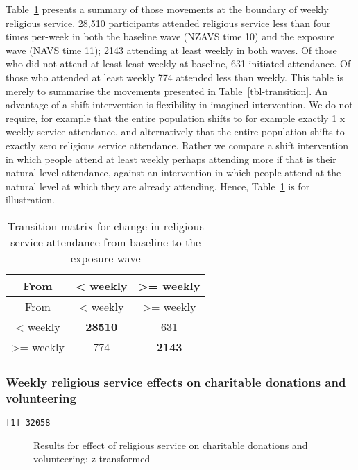 \documentclass[
  singlecolumn]{article}
\begin{document}
Table~\ref{tbl-transition-2} presents a summary of those movements at
the boundary of weekly religious service. 28,510 participants attended
religious service less than four times per-week in both the baseline
wave (NZAVS time 10) and the exposure wave (NAVS time 11); 2143
attending at least weekly in both waves. Of those who did not attend at
least least weekly at baseline, 631 initiated attendance. Of those who
attended at least weekly 774 attended less than weekly. This table is
merely to summarise the movements presented in
Table~\ref{tbl-transition}. An advantage of a shift intervention is
flexibility in imagined intervention. We do not require, for example
that the entire population shifts to for example exactly 1 x weekly
service attendance, and alternatively that the entire population shifts
to exactly zero religious service attendance. Rather we compare a shift
intervention in which people attend at least weekly perhaps attending
more if that is their natural level attendance, against an intervention
in which people attend at the natural level at which they are already
attending. Hence, Table~\ref{tbl-transition-2} is for illustration.

\begin{longtable}[]{@{}ccc@{}}
\caption{Transition matrix for change in religious service attendance
from baseline to the exposure
wave}\label{tbl-transition-2}\tabularnewline
\toprule\noalign{}
From & \textless{} weekly & \textgreater= weekly \\
\midrule\noalign{}
\endfirsthead
\toprule\noalign{}
From & \textless{} weekly & \textgreater= weekly \\
\midrule\noalign{}
\endhead
\bottomrule\noalign{}
\endlastfoot
\textless{} weekly & \textbf{28510} & 631 \\
\textgreater= weekly & 774 & \textbf{2143} \\
\end{longtable}

\subsubsection{Weekly religious service effects on charitable donations
and
volunteering}\label{weekly-religious-service-effects-on-charitable-donations-and-volunteering}

\begin{verbatim}
[1] 32058
\end{verbatim}

\begin{figure}


\caption{\label{fig-results-church-on-prosociality}Results for effect of
religious service on charitable donations and volunteering:
z-transformed}

\end{figure}%
\end{document}
